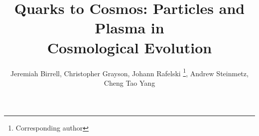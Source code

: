 \title{Quarks to Cosmos: Particles and Plasma in\\ 
 Cosmological Evolution}

\author{
Jeremiah Birrell, %
Christopher Grayson, %
Johann Rafelski%
\fnmsep\thanks{Corresponding author }, %
\newline Andrew Steinmetz, %
Cheng Tao Yang
}


